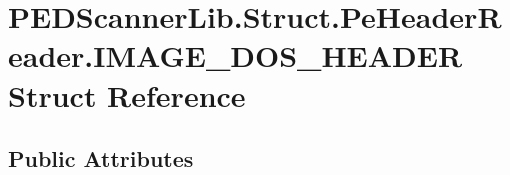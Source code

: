 \hypertarget{struct_p_e_d_scanner_lib_1_1_struct_1_1_pe_header_reader_1_1_i_m_a_g_e___d_o_s___h_e_a_d_e_r}{}\section{P\+E\+D\+Scanner\+Lib.\+Struct.\+Pe\+Header\+Reader.\+I\+M\+A\+G\+E\+\_\+\+D\+O\+S\+\_\+\+H\+E\+A\+D\+ER Struct Reference}
\label{struct_p_e_d_scanner_lib_1_1_struct_1_1_pe_header_reader_1_1_i_m_a_g_e___d_o_s___h_e_a_d_e_r}
\subsection*{Public Attributes}
